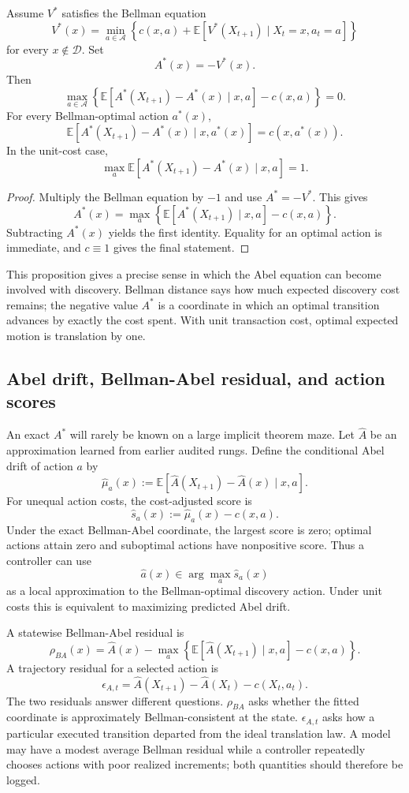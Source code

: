 \begin{proposition}
Assume $V^*$ satisfies the Bellman equation
\[
V^*(x)=\min_{a\in\mathcal A}\left\{c(x,a)+\mathbb E[V^*(X_{t+1})\mid X_t=x,a_t=a]\right\}
\]
for every $x\notin\mathcal D$. Set
\[
A^*(x)=-V^*(x).
\]
Then
\[
\max_{a\in\mathcal A}
\left\{
\mathbb E[A^*(X_{t+1})-A^*(x)\mid x,a]-c(x,a)
\right\}=0.
\]
For every Bellman-optimal action $a^*(x)$,
\[
\mathbb E[A^*(X_{t+1})-A^*(x)\mid x,a^*(x)]=c(x,a^*(x)).
\]
In the unit-cost case,
\[
\max_a\mathbb E[A^*(X_{t+1})-A^*(x)\mid x,a]=1.
\]
\end{proposition}

\begin{proof}
Multiply the Bellman equation by $-1$ and use $A^*=-V^*$. This gives
\[
A^*(x)=\max_a\left\{\mathbb E[A^*(X_{t+1})\mid x,a]-c(x,a)\right\}.
\]
Subtracting $A^*(x)$ yields the first identity. Equality for an optimal action is immediate, and $c\equiv1$ gives the final statement.
\end{proof}

This proposition gives a precise sense in which the Abel equation can become involved with discovery. Bellman distance says how much expected discovery cost remains; the negative value $A^*$ is a coordinate in which an optimal transition advances by exactly the cost spent. With unit transaction cost, optimal expected motion is translation by one.

\subsection{Abel drift, Bellman-Abel residual, and action scores}
An exact $A^*$ will rarely be known on a large implicit theorem maze. Let $\widehat A$ be an approximation learned from earlier audited rungs. Define the conditional Abel drift of action $a$ by
\[
\widehat\mu_a(x)
:=
\mathbb E[\widehat A(X_{t+1})-\widehat A(x)\mid x,a].
\]
For unequal action costs, the cost-adjusted score is
\[
\widehat s_a(x)
:=
\widehat\mu_a(x)-c(x,a).
\]
Under the exact Bellman-Abel coordinate, the largest score is zero; optimal actions attain zero and suboptimal actions have nonpositive score. Thus a controller can use
\[
\widehat a(x)\in\arg\max_a\widehat s_a(x)
\]
as a local approximation to the Bellman-optimal discovery action. Under unit costs this is equivalent to maximizing predicted Abel drift.

A statewise Bellman-Abel residual is
\[
\rho_{BA}(x)
=
\widehat A(x)-
\max_a\left\{
\mathbb E[\widehat A(X_{t+1})\mid x,a]-c(x,a)
\right\}.
\]
A trajectory residual for a selected action is
\[
\epsilon_{A,t}
=
\widehat A(X_{t+1})-\widehat A(X_t)-c(X_t,a_t).
\]
The two residuals answer different questions. $\rho_{BA}$ asks whether the fitted coordinate is approximately Bellman-consistent at the state. $\epsilon_{A,t}$ asks how a particular executed transition departed from the ideal translation law. A model may have a modest average Bellman residual while a controller repeatedly chooses actions with poor realized increments; both quantities should therefore be logged.

